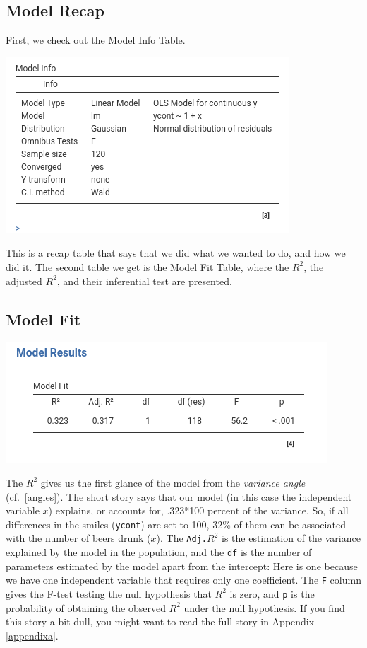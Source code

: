 \documentclass[
]{book}
\begin{document}
\hypertarget{model-recap}{%
\subsection{Model Recap}\label{model-recap}}

First, we check out the {Model Info} Table.

\includegraphics[width=0.9\linewidth]{bookletpics/2_output1}

This is a recap table that says that we did what we wanted to do, and how we did it. The second table we get is the {Model Fit} Table, where the \(R^2\), the adjusted \(R^2\), and their inferential test are presented.

\hypertarget{twofit}{%
\subsection{Model Fit}\label{twofit}}

\includegraphics[width=0.9\linewidth]{bookletpics/2_output2}

The \(R^2\) gives us the first glance of the model from the \emph{variance angle} (cf.~\ref{angles}). The short story says that our model (in this case the independent variable \(x\)) explains, or accounts for, .323*100 percent of the variance. So, if all differences in the smiles (\texttt{ycont}) are set to 100, 32\% of them can be associated with the number of beers drunk (\(x\)). The \texttt{Adj.}\(R^2\) is the estimation of the variance explained by the model in the population, and the \texttt{df} is the number of parameters estimated by the model apart from the intercept: Here is one because we have one independent variable that requires only one coefficient. The \texttt{F} column gives the F-test testing the null hypothesis that \(R^2\) is zero, and \texttt{p} is the probability of obtaining the observed \(R^2\) under the null hypothesis. If you find this story a bit dull, you might want to read the full story in Appendix \ref{appendixa}.
\end{document}
